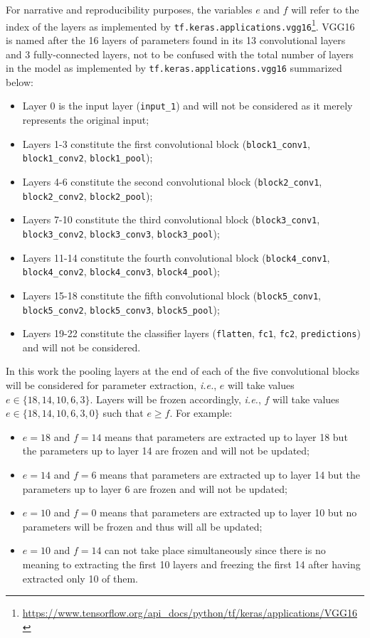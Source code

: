 For narrative and reproducibility purposes, the variables $e$ and $f$ will refer to the index of the layers as implemented by \verb|tf.keras.applications.vgg16|\footnote{\url{https://www.tensorflow.org/api_docs/python/tf/keras/applications/VGG16}}. VGG16 is named after the 16 layers of parameters found in its 13 convolutional layers and 3 fully-connected layers, not to be confused with the total number of layers in the model as implemented by \verb|tf.keras.applications.vgg16| summarized below:

\begin{itemize}
    \item Layer 0 is the input layer (\verb|input_1|) and will not be considered as it merely represents the original input;
    \item Layers 1-3 constitute the first convolutional block (\verb|block1_conv1|, \verb|block1_conv2|, \verb|block1_pool|);
    \item Layers 4-6 constitute the second convolutional block (\verb|block2_conv1|, \verb|block2_conv2|, \verb|block2_pool|);
    \item Layers 7-10 constitute the third convolutional block (\verb|block3_conv1|, \verb|block3_conv2|, \verb|block3_conv3|, \verb|block3_pool|);
    \item Layers 11-14 constitute the fourth convolutional block (\verb|block4_conv1|, \verb|block4_conv2|, \verb|block4_conv3|, \verb|block4_pool|);
    \item Layers 15-18 constitute the fifth convolutional block (\verb|block5_conv1|, \verb|block5_conv2|, \verb|block5_conv3|, \verb|block5_pool|);
    \item Layers 19-22 constitute the classifier layers (\verb|flatten|, \verb|fc1|, \verb|fc2|, \verb|predictions|) and will not be considered.
\end{itemize}

In this work the pooling layers at the end of each of the five convolutional blocks will be considered for parameter extraction, \textit{i.e.}, $e$ will take values $e \in \{18, 14, 10, 6, 3\}$. Layers will be frozen accordingly, \textit{i.e.}, $f$ will take values $e \in \{18, 14, 10, 6, 3, 0\}$ such that $e \geq f$. For example:

\begin{itemize}
    \item $e = 18$ and $f = 14$ means that parameters are extracted up to layer 18 but the parameters up to layer 14 are frozen and will not be updated;
    \item $e = 14$ and $f = 6$ means that parameters are extracted up to layer 14 but the parameters up to layer 6 are frozen and will not be updated;
    \item $e = 10$ and $f = 0$ means that parameters are extracted up to layer 10 but no parameters will be frozen and thus will all be updated;
    \item $e = 10$ and $f = 14$ can not take place simultaneously since there is no meaning to extracting the first 10 layers and freezing the first 14 after having extracted only 10 of them.
\end{itemize}

